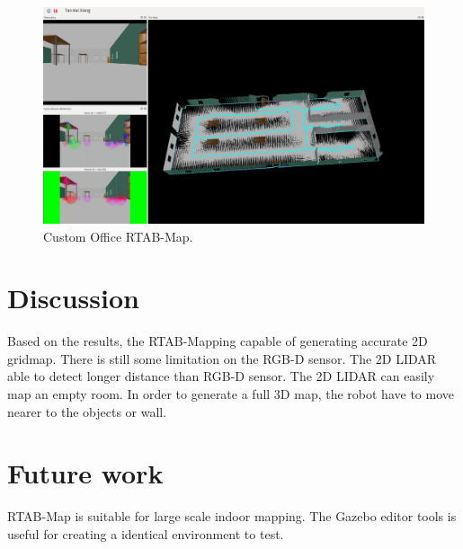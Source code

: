 \documentclass[10pt,journal,compsoc]{IEEEtran}
\begin{document}
\begin{figure}[thpb]
      \centering
      \includegraphics[width=\linewidth]{custom_office_rtabmap.png}
      \caption{Custom Office RTAB-Map.}
      \label{fig:robot7}
\end{figure}

\section{Discussion}
Based on the results, the RTAB-Mapping capable of generating accurate 2D gridmap. There is still some limitation on the RGB-D sensor. The 2D LIDAR able to detect longer distance than RGB-D sensor. The 2D LIDAR can easily map an empty room. In order to generate a full 3D map, the robot have to move nearer to the objects or wall.

\section{Future work}
RTAB-Map is suitable for large scale indoor mapping. The Gazebo editor tools is useful for creating a identical environment to test. 



\end{document}
